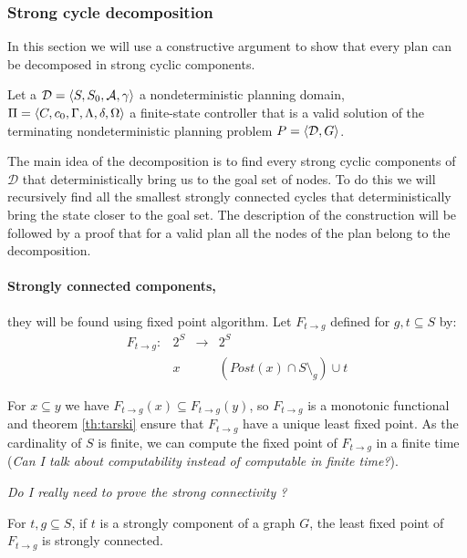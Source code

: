 \subsubsection{Strong cycle decomposition}

In this section we will use a constructive argument to show that every plan can be decomposed in strong cyclic components.

Let a $\mathcal{D} = \planningdomain$ a nondeterministic planning domain, $\Pi = \controller$ a finite-state controller that is a valid solution of the terminating nondeterministic planning problem $P = \planningproblem$.

The main idea of the decomposition is to find every strong cyclic components of $\mathcal{D}$ that deterministically bring us to the goal set of nodes.
To do this we will recursively find all the smallest strongly connected cycles that deterministically bring the state closer to the goal set.
The description of the construction will be followed by a proof that for a valid plan  all the nodes of the plan belong to the decomposition.

\paragraph{Strongly connected components,} they will be found using fixed point algorithm.
Let $F_{t \rightarrow g}$ defined for $g,t \subseteq S$ by:
\begin{equation}
\begin{array}{llll}
F_{t \rightarrow g} :& 2^S & \rightarrow & 2^S\\
 & x &  & (Post(x) \cap S \setminus_g) \cup t
\end{array}
\end{equation}


For $x \subseteq y$ we have $F_{t \rightarrow g} (x) \subseteq F_{t \rightarrow g}(y)$, so $F_{t \rightarrow g}$ is a monotonic functional and theorem \ref{th:tarski} ensure that $F_{t \rightarrow g}$ have a unique least fixed point.
As the cardinality of $S$ is finite, we can compute the fixed point of $F_{t \rightarrow g}$ in a finite time
(\textit{Can I talk about computability instead of computable in finite time?}).

\textit{Do I really need to prove the strong connectivity ?}
\begin{prop}
For $t,g \subseteq S$, if $t$ is a strongly component of a graph $G$, the least fixed point of $F_{t \rightarrow g}$ is strongly connected.
\end{prop}

